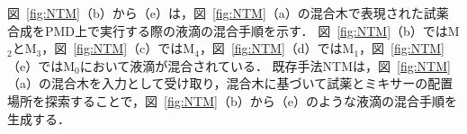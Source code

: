 
図~\ref{fig:NTM}（b）から（e）は，図~\ref{fig:NTM}（a）の混合木で表現された試薬合成をPMD上で実行する際の液滴の混合手順を示す．
図~\ref{fig:NTM}（b）ではM$_2$とM$_3$，図~\ref{fig:NTM}（c）ではM$_4$，図~\ref{fig:NTM}（d）ではM$_1$，図~\ref{fig:NTM}（e）ではM$_0$において液滴が混合されている．
既存手法NTMは，図~\ref{fig:NTM}（a）の混合木を入力として受け取り，混合木に基づいて試薬とミキサーの配置場所を探索することで，図~\ref{fig:NTM}（b）から（e）のような液滴の混合手順を生成する．

